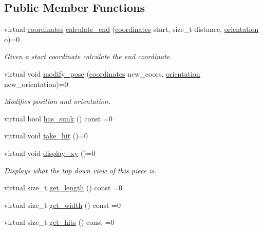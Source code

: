 \subsection*{Public Member Functions}
\begin{DoxyCompactItemize}
\item 
virtual \hyperlink{structbattle__ship_1_1coordinates}{coordinates} \hyperlink{classbattle__ship_1_1piece_a58092f7b1d663471204d7e51e68bbb2d}{calculate\+\_\+end} (\hyperlink{structbattle__ship_1_1coordinates}{coordinates} start, size\+\_\+t distance, \hyperlink{namespacebattle__ship_aed87488f0a73f0d0679fe343fb61c784}{orientation} o)=0
\begin{DoxyCompactList}\small\item\em Given a start coordinate calculate the end coordinate. \end{DoxyCompactList}\item 
virtual void \hyperlink{classbattle__ship_1_1piece_a052305c855625732d3e5ba96d0fca5f9}{modify\+\_\+pose} (\hyperlink{structbattle__ship_1_1coordinates}{coordinates} new\+\_\+coors, \hyperlink{namespacebattle__ship_aed87488f0a73f0d0679fe343fb61c784}{orientation} new\+\_\+orientation)=0
\begin{DoxyCompactList}\small\item\em Modifies position and orientation. \end{DoxyCompactList}\item 
virtual bool \hyperlink{classbattle__ship_1_1piece_af22bd781f4206decd0beed89b014d1cc}{has\+\_\+sunk} () const =0
\item 
virtual void \hyperlink{classbattle__ship_1_1piece_a77642906503e12eb22fcfbc3eab98cb5}{take\+\_\+hit} ()=0
\item 
virtual void \hyperlink{classbattle__ship_1_1piece_a0f900b13641277ae9e809e4baa5c8c10}{display\+\_\+xy} ()=0
\begin{DoxyCompactList}\small\item\em Displays what the top down view of this piece is. \end{DoxyCompactList}\item 
virtual size\+\_\+t \hyperlink{classbattle__ship_1_1piece_a0188cda34ef90374396c52595761ef08}{get\+\_\+length} () const =0
\item 
virtual size\+\_\+t \hyperlink{classbattle__ship_1_1piece_abd5b9073f2fa6201c4dbc35b43942d2f}{get\+\_\+width} () const =0
\item 
virtual size\+\_\+t \hyperlink{classbattle__ship_1_1piece_a51123474a964caa97a4c29b053ac0fad}{get\+\_\+hits} () const =0

\end{DoxyCompactItemize}
